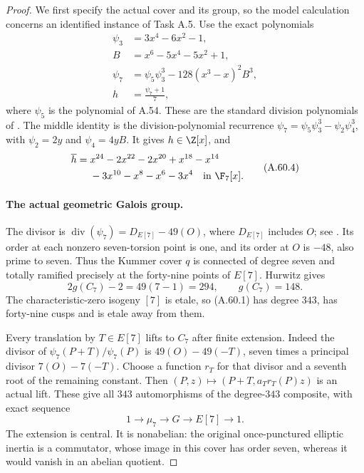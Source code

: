 \begin{proof}
We first specify the actual cover and its group, so the
model calculation concerns an identified instance of Task A.5.
Use the exact polynomials
\[
\begin{aligned}
 \psi _3&=3x^4-6x^2-1,\\
 B&=x^6-5x^4-5x^2+1,\\
 \psi _7&=\psi _5\psi _3^3-128(x^3-x)^2B^3,
 \\ h&=\frac{\psi _7+1}{7},
\end{aligned} \tag{A.60.3}
\]
where \(\psi _5\) is the polynomial of A.54. These are the
standard division polynomials of \cite[Exercise III.3.7,
pp.105--106]{fghSilvermanAEC}. The middle
identity is the division-polynomial recurrence
\(\psi _7=\psi _5\psi _3^3-\psi _2\psi _4^3\), with
\(\psi _2=2y\) and \(\psi _4=4yB\).
It gives \(h\in\Z[x]\), and
\[
 \begin{aligned}
 \overline h={}&x^{24}-2x^{22}-2x^{20}+x^{18}-x^{14}\\
               &-3x^{10}-x^8-x^6-3x^4
                   \quad\text{in }\F_7[x].
 \end{aligned}
                                                        \tag{A.60.4}
\]

\paragraph{The actual geometric Galois group.}
The divisor is
\(\operatorname{div}(\psi _7)=D_{E[7]}-49(O)\),
where \(D_{E[7]}\) includes \(O\); see
\cite[Exercise III.3.7(f), p.106]{fghSilvermanAEC}. Its order at each
nonzero seven-torsion point is one, and its order at
\(O\) is \(-48\), also prime to seven. Thus the
Kummer cover \(q\) is connected of degree seven and
totally ramified precisely at the forty-nine points of
\(E[7]\). Hurwitz gives
\[
                2g(C_7)-2=49(7-1)=294,
                           \qquad g(C_7)=148.          \tag{A.60.5}
\]
The characteristic-zero isogeny \([7]\) is etale, so
(A.60.1) has degree \(343\), has forty-nine cusps and
is etale away from them.

Every translation by \(T\in E[7]\) lifts to \(C_7\)
after finite extension. Indeed the divisor of
\(\psi _7(P+T)/\psi _7(P)\) is
\(49(O)-49(-T)\), seven times a principal divisor
\(7(O)-7(-T)\). Choose a function \(r_T\) for that
divisor and a seventh root of the remaining constant.
Then \((P,z)\mapsto(P+T,a_T r_T(P)z)\) is an actual
lift. These give all \(343\) automorphisms of the
degree-\(343\) composite, with exact sequence
\[
                 1\longrightarrow\mu _7
                 \longrightarrow G\longrightarrow E[7]
                 \longrightarrow1.                   \tag{A.60.6}
\]
The extension is central. It is nonabelian: the original
once-punctured elliptic inertia is a commutator, whose
image in this cover has order seven, whereas it would
vanish in an abelian quotient.


\end{proof}
